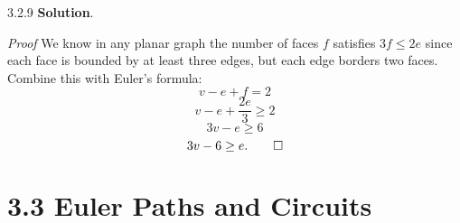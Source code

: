 \documentclass[11pt,]{book}
\makeatletter
\theoremstyle{ptxplainnotitle}
\theoremstyle{ptxplaintitle}
\renewcommand*{\proofname}{Proof}
\renewenvironment{proof}[1][\proofname]{\par
  \pushQED{\qed}%
  \normalfont \topsep6\p@\@plus6\p@\relax
  \trivlist
  \item\relax
    {\itshape
    #1\@addpunct{.}}\hspace\labelsep\ignorespaces
}{%
  \popQED\endtrivlist\@endpefalse
}
\theoremstyle{ptxdefinitionnotitle}
\theoremstyle{ptxdefinitiontitle}
\theoremstyle{ptxdefinitionnotitle}
\theoremstyle{ptxdefinitiontitle}
\theoremstyle{ptxdefinitionnotitle}
\theoremstyle{ptxdefinitiontitle}
\theoremstyle{ptxdefinitiontitlenonumber}
\theoremstyle{ptxdefinitiontitlenonumber}
\numberwithin{equation}{chapter}
\makeatother
\begin{document}
\begin{divisionexercise}{3.2.9}
\textbf{Solution}.\quad%
\begin{proof}\hypertarget{proof-44}{}
\hypertarget{p-2873}{}%
We know in any planar graph the number of faces \(f\) satisfies \(3f \le 2e\) since each face is bounded by at least three edges, but each edge borders two faces. Combine this with Euler's formula:%
\begin{equation*}
v - e + f = 2
\end{equation*}
%
\begin{equation*}
v - e + \frac{2e}{3} \ge 2
\end{equation*}
%
\begin{equation*}
3v - e \ge 6
\end{equation*}
%
\begin{equation*}
3v - 6 \ge e.\qedhere
\end{equation*}
%
\end{proof}
\end{divisionexercise}%
\section*{3.3 Euler Paths and Circuits}
\end{document}
